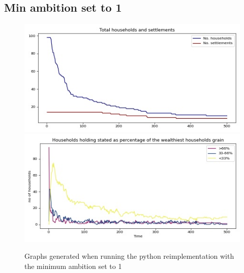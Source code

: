 \documentclass[12pt]{article}
\begin{document}
			\subsection{Min ambition set to 1}
				\begin{figure}[!htb]
					\includegraphics[width=12cm]{Min_ambition_run1_A}\\
					\includegraphics[width=12cm]{Min_ambition_run1_B}
					\caption{Graphs generated when running the python reimplementation with the minimum ambition set to 1}
					\label{fig:Min_Ambition_ours_1}
				\end{figure}
					
\end{document}

